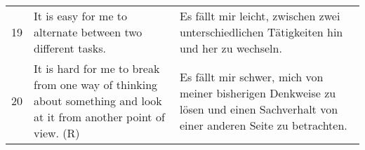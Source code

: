 \begin{RaggedRight}
\begin{center}
\begin{longtable}[t]{|l|p{6.6 cm}|p{6.6 cm}|}
        19 & It is easy for me to alternate between two different tasks. & Es fällt mir leicht, zwischen zwei unterschiedlichen Tätigkeiten hin und her zu wechseln. \\
        20 & It is hard for me to break from one way of thinking about something and look at it from another point of view. (R) & Es fällt mir schwer, mich von meiner bisherigen Denkweise zu lösen und einen Sachverhalt von einer anderen Seite zu betrachten. \\ \hline
    \end{longtable}
	\label{tab:AcsUebersetzung}
\end{center}
\end{RaggedRight}
